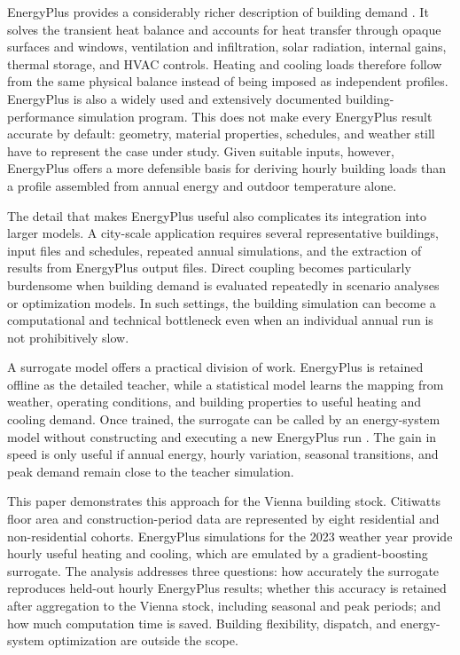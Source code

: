 \documentclass[10pt,twocolumn]{article}
\begin{document}
EnergyPlus provides a considerably richer description of building demand
\cite{crawley2001,doe2026}. It solves the transient heat balance and accounts
for heat transfer through opaque surfaces and windows, ventilation and
infiltration, solar radiation, internal gains, thermal storage, and HVAC
controls. Heating and cooling loads therefore follow from the same physical
balance instead of being imposed as independent profiles. EnergyPlus is also a
widely used and extensively documented building-performance simulation
program. This does not make every EnergyPlus result accurate by default:
geometry, material properties, schedules, and weather still have to represent
the case under study. Given suitable inputs, however, EnergyPlus offers a more
defensible basis for deriving hourly building loads than a profile assembled
from annual energy and outdoor temperature alone.

The detail that makes EnergyPlus useful also complicates its integration into
larger models. A city-scale application requires several representative
buildings, input files and schedules, repeated annual simulations, and the
extraction of results from EnergyPlus output files. Direct coupling becomes
particularly burdensome when building demand is evaluated repeatedly in
scenario analyses or optimization models. In such settings, the building
simulation can become a computational and technical bottleneck even when an
individual annual run is not prohibitively slow.

A surrogate model offers a practical division of work. EnergyPlus is retained
offline as the detailed teacher, while a statistical model learns the mapping
from weather, operating conditions, and building properties to useful heating
and cooling demand. Once trained, the surrogate can be called by an
energy-system model without constructing and executing a new EnergyPlus run
\cite{westermann2019,amasyali2018}. The gain in speed is only useful if annual
energy, hourly variation, seasonal transitions, and peak demand remain close to
the teacher simulation.

This paper demonstrates this approach for the Vienna building stock.
Citiwatts floor area and construction-period data are represented by eight
residential and non-residential cohorts. EnergyPlus simulations for the 2023
weather year provide hourly useful heating and cooling, which are emulated by a
gradient-boosting surrogate. The analysis addresses three questions: how
accurately the surrogate reproduces held-out hourly EnergyPlus results; whether
this accuracy is retained after aggregation to the Vienna stock, including
seasonal and peak periods; and how much computation time is saved. Building
flexibility, dispatch, and energy-system optimization are outside the scope.
\end{document}
